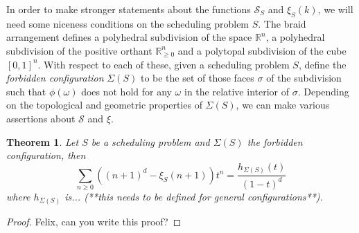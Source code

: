 \documentclass[12pt,reqno]{amsart}
\numberwithin{definition}{section}
\newtheorem{theorem}[definition]{Theorem}
\newcommand{\RR}{\mathbb{R}}
\newcommand{\SSS}{\mathcal{S}}
\begin{document}
In order to make stronger statements about the functions $\SSS_S$ and $\xi_S(k)$, we will need some niceness conditions on the scheduling problem $S$.  
The braid arrangement defines a polyhedral subdivision of the space
$\RR^n$, a polyhedral subdivision of the positive orthant $\RR_{\geq
  0}^n$ and a polytopal subdivision of the cube $[0,1]^n$. With
respect to each of these, given a scheduling problem $S$, define the \emph{forbidden configuration}
$\Sigma(S)$ to be the set of those faces $\sigma$ of the subdivision
such that $\phi(\omega)$ does not hold for any $\omega$ in the
relative interior of $\sigma$. Depending on the topological and
geometric properties of $\Sigma(S)$, we can make various assertions
about $\SSS$ and $\xi$. 


\begin{theorem}
Let $S$ be a scheduling problem and $\Sigma(S)$ the forbidden configuration, then
$$ \sum_{n \geq 0} ((n+1)^d - \xi_S(n+1)) t^n = \frac{h_{\Sigma(S)}(t)}{(1-t)^d} $$
where $h_{\Sigma(S)}$ is... (**this needs to be defined for general configurations**).
\end{theorem}
\begin{proof}
Felix, can you write this proof?
\end{proof}
\end{document}
